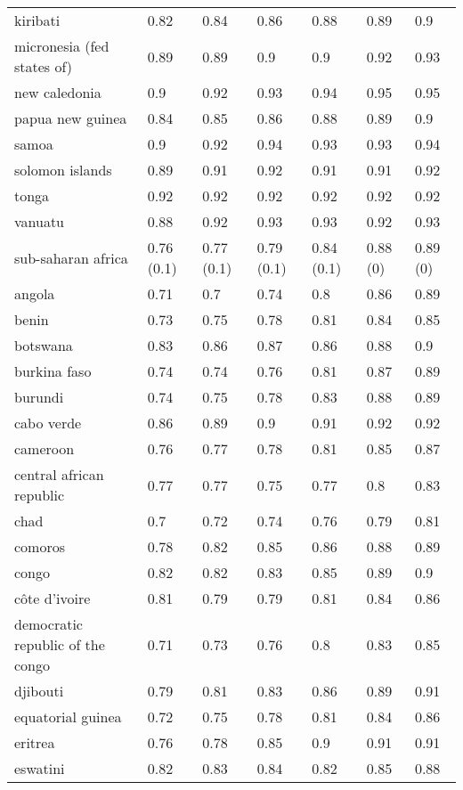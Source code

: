 \begin{longtable}[t]{lllllll}
\addlinespace
kiribati & 0.82 & 0.84 & 0.86 & 0.88 & 0.89 & 0.9\\
micronesia (fed states of) & 0.89 & 0.89 & 0.9 & 0.9 & 0.92 & 0.93\\
new caledonia & 0.9 & 0.92 & 0.93 & 0.94 & 0.95 & 0.95\\
papua new guinea & 0.84 & 0.85 & 0.86 & 0.88 & 0.89 & 0.9\\
samoa & 0.9 & 0.92 & 0.94 & 0.93 & 0.93 & 0.94\\
\addlinespace
solomon islands & 0.89 & 0.91 & 0.92 & 0.91 & 0.91 & 0.92\\
tonga & 0.92 & 0.92 & 0.92 & 0.92 & 0.92 & 0.92\\
vanuatu & 0.88 & 0.92 & 0.93 & 0.93 & 0.92 & 0.93\\
sub-saharan africa & 0.76 (0.1) & 0.77 (0.1) & 0.79 (0.1) & 0.84 (0.1) & 0.88 (0) & 0.89 (0)\\
angola & 0.71 & 0.7 & 0.74 & 0.8 & 0.86 & 0.89\\
\addlinespace
benin & 0.73 & 0.75 & 0.78 & 0.81 & 0.84 & 0.85\\
botswana & 0.83 & 0.86 & 0.87 & 0.86 & 0.88 & 0.9\\
burkina faso & 0.74 & 0.74 & 0.76 & 0.81 & 0.87 & 0.89\\
burundi & 0.74 & 0.75 & 0.78 & 0.83 & 0.88 & 0.89\\
cabo verde & 0.86 & 0.89 & 0.9 & 0.91 & 0.92 & 0.92\\
\addlinespace
cameroon & 0.76 & 0.77 & 0.78 & 0.81 & 0.85 & 0.87\\
central african republic & 0.77 & 0.77 & 0.75 & 0.77 & 0.8 & 0.83\\
chad & 0.7 & 0.72 & 0.74 & 0.76 & 0.79 & 0.81\\
comoros & 0.78 & 0.82 & 0.85 & 0.86 & 0.88 & 0.89\\
congo & 0.82 & 0.82 & 0.83 & 0.85 & 0.89 & 0.9\\
\addlinespace
côte d'ivoire & 0.81 & 0.79 & 0.79 & 0.81 & 0.84 & 0.86\\
democratic republic of the congo & 0.71 & 0.73 & 0.76 & 0.8 & 0.83 & 0.85\\
djibouti & 0.79 & 0.81 & 0.83 & 0.86 & 0.89 & 0.91\\
equatorial guinea & 0.72 & 0.75 & 0.78 & 0.81 & 0.84 & 0.86\\
eritrea & 0.76 & 0.78 & 0.85 & 0.9 & 0.91 & 0.91\\
\addlinespace
eswatini & 0.82 & 0.83 & 0.84 & 0.82 & 0.85 & 0.88\\

\end{longtable}
